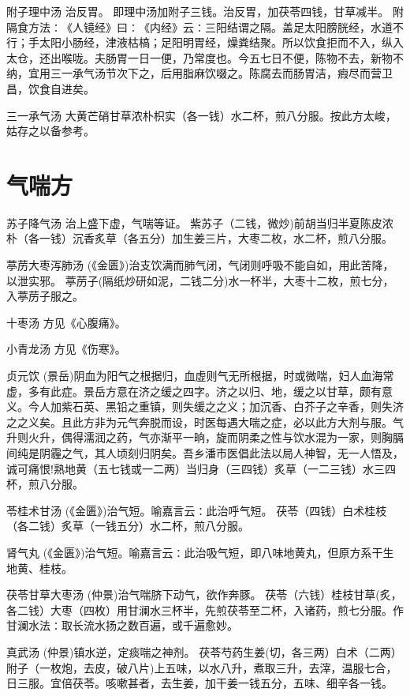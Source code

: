 \documentclass[a4paper,12pt,UTF8,twoside]{ctexbook}
\begin{document}
    附子理中汤
    治反胃。
    即理中汤加附子三钱。治反胃，加茯苓四钱，甘草减半。
    附隔食方法∶《人镜经》曰∶《内经》云∶三阳结谓之隔。盖足太阳膀胱经，水道不行；手太阳小肠经，津液枯槁；足阳明胃经，燥粪结聚。所以饮食拒而不入，纵入太仓，还出喉咙。夫肠胃一日一便，乃常度也。今五七日不便，陈物不去，新物不纳，宜用三一承气汤节次下之，后用脂麻饮啜之。陈腐去而肠胃洁，瘕尽而营卫昌，饮食自进矣。
    
    三一承气汤
    大黄芒硝甘草浓朴枳实（各一钱）水二杯，煎八分服。按此方太峻，姑存之以备参考。
    
	\chapter{气喘方}
	
	苏子降气汤
	治上盛下虚，气喘等证。
	紫苏子（二钱，微炒)前胡当归半夏陈皮浓朴（各一钱）沉香炙草（各五分）加生姜三片，大枣二枚，水二杯，煎八分服。
	
	葶苈大枣泻肺汤
	(《金匮》)治支饮满而肺气闭，气闭则呼吸不能自如，用此苦降，以泄实邪。
	葶苈子(隔纸炒研如泥，二钱二分)水一杯半，大枣十二枚，煎七分，入葶苈子服之。
	
	十枣汤
	方见《心腹痛》。
	
	小青龙汤
	方见《伤寒》。
	
	贞元饮
	(景岳)阴血为阳气之根据归，血虚则气无所根据，时或微喘，妇人血海常虚，多有此症。景岳方意在济之缓之四字。济之以归、地，缓之以甘草，颇有意义。今人加紫石英、黑铅之重镇，则失缓之之义；加沉香、白芥子之辛香，则失济之之义矣。且此方非为元气奔脱而设，时医每遇大喘之症，必以此方大剂与服。气升则火升，偶得濡润之药，气亦渐平一晌，旋而阴柔之性与饮水混为一家，则胸膈间纯是阴霾之气，其人顷刻归阴矣。吾乡潘市医倡此法以局人神智，无一人悟及，诚可痛恨!熟地黄（五七钱或一二两）当归身（三四钱）炙草（一二三钱）水三四杯，煎八分服。
	
	苓桂术甘汤
	(《金匮》)治气短。喻嘉言云∶此治呼气短。
	茯苓（四钱）白术桂枝（各二钱）炙草（一钱五分）水二杯，煎八分服。
	
	肾气丸
	(《金匮》)治气短。喻嘉言云∶此治吸气短，即八味地黄丸，但原方系干生地黄、桂枝。
	
	茯苓甘草大枣汤
	(仲景)治气喘脐下动气，欲作奔豚。
	茯苓（六钱）桂枝甘草(炙，各二钱）大枣（四枚）用甘澜水三杯半，先煎茯苓至二杯，入诸药，煎七分服。作甘澜水法∶取长流水扬之数百遍，或千遍愈妙。
	
	真武汤
	(仲景)镇水逆，定痰喘之神剂。
	茯苓芍药生姜(切，各三两）白术（二两）附子（一枚炮，去皮，破八片)上五味，以水八升，煮取三升，去滓，温服七合，日三服。宜倍茯苓。咳嗽甚者，去生姜，加干姜一钱五分，五味、细辛各一钱。
	
\end{document}
